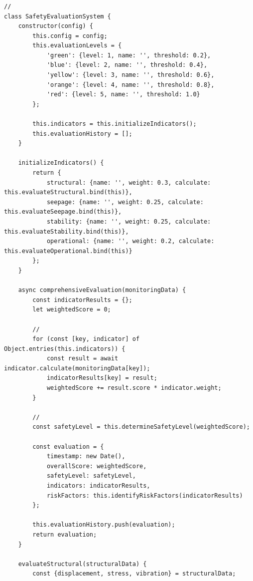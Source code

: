 \subsubsection{}\label{section-52}

\begin{verbatim}
// 
class SafetyEvaluationSystem {
    constructor(config) {
        this.config = config;
        this.evaluationLevels = {
            'green': {level: 1, name: '', threshold: 0.2},
            'blue': {level: 2, name: '', threshold: 0.4}, 
            'yellow': {level: 3, name: '', threshold: 0.6},
            'orange': {level: 4, name: '', threshold: 0.8},
            'red': {level: 5, name: '', threshold: 1.0}
        };
        
        this.indicators = this.initializeIndicators();
        this.evaluationHistory = [];
    }
    
    initializeIndicators() {
        return {
            structural: {name: '', weight: 0.3, calculate: this.evaluateStructural.bind(this)},
            seepage: {name: '', weight: 0.25, calculate: this.evaluateSeepage.bind(this)}, 
            stability: {name: '', weight: 0.25, calculate: this.evaluateStability.bind(this)},
            operational: {name: '', weight: 0.2, calculate: this.evaluateOperational.bind(this)}
        };
    }
    
    async comprehensiveEvaluation(monitoringData) {
        const indicatorResults = {};
        let weightedScore = 0;
        
        // 
        for (const [key, indicator] of Object.entries(this.indicators)) {
            const result = await indicator.calculate(monitoringData[key]);
            indicatorResults[key] = result;
            weightedScore += result.score * indicator.weight;
        }
        
        // 
        const safetyLevel = this.determineSafetyLevel(weightedScore);
        
        const evaluation = {
            timestamp: new Date(),
            overallScore: weightedScore,
            safetyLevel: safetyLevel,
            indicators: indicatorResults,
            riskFactors: this.identifyRiskFactors(indicatorResults)
        };
        
        this.evaluationHistory.push(evaluation);
        return evaluation;
    }
    
    evaluateStructural(structuralData) {
        const {displacement, stress, vibration} = structuralData;
        

\end{verbatim}
